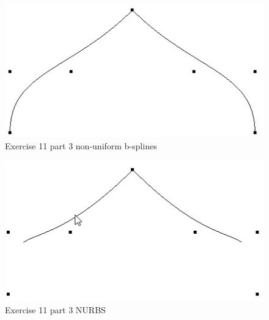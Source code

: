 \begin{figure}[ht!]
	\begin{center}
		\includegraphics[width=1.0\textwidth]{figures/exercise_11_part_3_3}
	\end{center}
	\vspace{-4.5ex}\caption{Exercise 11 part 3 non-uniform b-splines}
	\label{fig:exercise_11_part_3_3} 
\end{figure}
\begin{figure}[ht!]
	\begin{center}
		\includegraphics[width=1.0\textwidth]{figures/exercise_11_part_3_4}
	\end{center}
	\vspace{-4.5ex}\caption{Exercise 11 part 3 NURBS}
	\label{fig:exercise_11_part_3_4} 
\end{figure}
\clearpage
